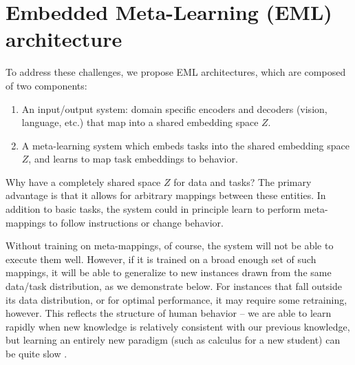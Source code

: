 \documentclass{article}
\begin{document}
\section{Embedded Meta-Learning (EML) architecture}
\vspace{-0.5em} %
To address these challenges, we propose EML architectures, which are composed of two components: 
\vspace{-1em}
\begin{enumerate} \setlength \itemsep{0em}
\item An input/output system: domain specific encoders and decoders (vision, language, etc.) that map into a shared embedding space $Z$.
\item A meta-learning system which embeds tasks into the shared embedding space $Z$, and learns to map task embeddings to behavior.
\end{enumerate}
\vspace{-0.75em}
Why have a completely shared space $Z$ for data and tasks? The primary advantage is that it allows for arbitrary mappings between these entities. In addition to basic tasks, the system could in principle learn to perform meta-mappings to follow instructions or change behavior. \par
Without training on meta-mappings, of course, the system will not be able to execute them well. However, if it is trained on a broad enough set of such mappings, it will be able to generalize to new instances drawn from the same data/task distribution, as we demonstrate below. For instances that fall outside its data distribution, or for optimal performance, it may require some retraining, however. This reflects the structure of human behavior -- we are able to learn rapidly when new knowledge is relatively consistent with our previous knowledge, but learning an entirely new paradigm (such as calculus for a new student) can be quite slow \citep[cf.][]{Kumaran2016}. \par 
\end{document}
